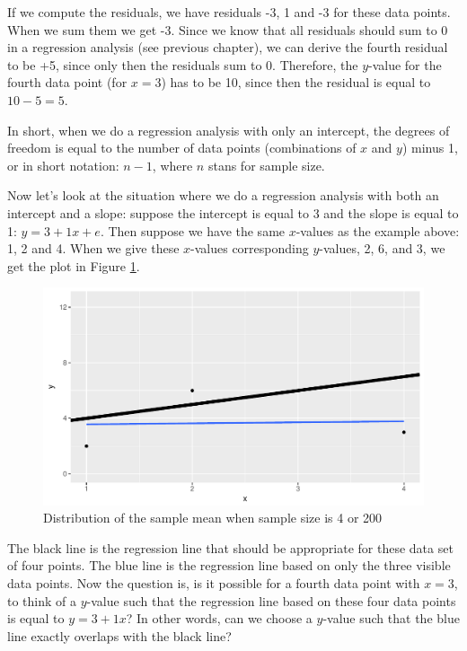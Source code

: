 \documentclass[]{report}\usepackage[]{graphicx}\usepackage[]{color}
\makeatletter
\def\maxwidth{ %
  \ifdim\Gin@nat@width>\linewidth
    \linewidth
  \else
    \Gin@nat@width
  \fi
}
\newenvironment{knitrout}{}{} %
\makeatother
\begin{document}
If we compute the residuals, we have residuals -3, 1 and -3 for these data points. When we sum them we get -3. Since we know that all residuals should sum to 0 in a regression analysis (see previous chapter), we can derive the fourth residual to be +5, since only then the residuals sum to 0. Therefore, the $y$-value for the fourth data point (for $x=3$) has to be 10, since then the residual is equal to $10-5=5$.

In short, when we do a regression analysis with only an intercept, the degrees of freedom is equal to the number of data points (combinations of $x$ and $y$) minus 1, or in short notation: $n-1$, where $n$ stans for sample size.

Now let's look at the situation where we do a regression analysis with both an intercept and a slope: suppose the intercept is equal to 3 and the slope is equal to 1: $y=3+1 x+e$. Then suppose we have the same $x$-values as the example above: 1, 2 and 4. When we give these $x$-values corresponding $y$-values, 2, 6, and 3, we get the plot in Figure \ref{fig:inf_12}.

\begin{knitrout}
\color{fgcolor}\begin{figure}

{\centering \includegraphics[width=\maxwidth]{figure/inf_12-1} 

}

\caption[Distribution of the sample mean when sample size is 4 or 200]{Distribution of the sample mean when sample size is 4 or 200}\label{fig:inf_12}
\end{figure}


\end{knitrout}

The black line is the regression line that should be appropriate for these data set of four points. The blue line is the regression line based on only the three visible data points. Now the question is, is it possible for a fourth data point with $x=3$, to think of a $y$-value such that the regression line based on these four data points is equal to $y=3+1x$? In other words, can we choose a $y$-value such that the blue line exactly overlaps with the black line?
\end{document}
